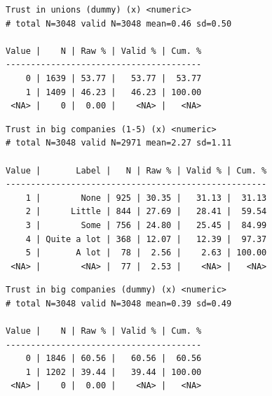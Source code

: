 \documentclass[
  letterpaper,
  DIV=11,
  numbers=noendperiod]{scrreprt}
\newenvironment{Shaded}{\begin{snugshade}}{\end{snugshade}}
\newcommand{\FunctionTok}[1]{\textcolor[rgb]{0.28,0.35,0.67}{#1}}
\newcommand{\NormalTok}[1]{\textcolor[rgb]{0.00,0.23,0.31}{#1}}
\newcommand{\SpecialCharTok}[1]{\textcolor[rgb]{0.37,0.37,0.37}{#1}}
\begin{document}
\begin{Shaded}
\end{Shaded}

\begin{verbatim}
Trust in unions (dummy) (x) <numeric> 
# total N=3048 valid N=3048 mean=0.46 sd=0.50

Value |    N | Raw % | Valid % | Cum. %
---------------------------------------
    0 | 1639 | 53.77 |   53.77 |  53.77
    1 | 1409 | 46.23 |   46.23 | 100.00
 <NA> |    0 |  0.00 |    <NA> |   <NA>
\end{verbatim}

\begin{Shaded}
\end{Shaded}

\begin{verbatim}
Trust in big companies (1-5) (x) <numeric> 
# total N=3048 valid N=2971 mean=2.27 sd=1.11

Value |       Label |   N | Raw % | Valid % | Cum. %
----------------------------------------------------
    1 |        None | 925 | 30.35 |   31.13 |  31.13
    2 |      Little | 844 | 27.69 |   28.41 |  59.54
    3 |        Some | 756 | 24.80 |   25.45 |  84.99
    4 | Quite a lot | 368 | 12.07 |   12.39 |  97.37
    5 |       A lot |  78 |  2.56 |    2.63 | 100.00
 <NA> |        <NA> |  77 |  2.53 |    <NA> |   <NA>
\end{verbatim}

\begin{Shaded}
\end{Shaded}

\begin{verbatim}
Trust in big companies (dummy) (x) <numeric> 
# total N=3048 valid N=3048 mean=0.39 sd=0.49

Value |    N | Raw % | Valid % | Cum. %
---------------------------------------
    0 | 1846 | 60.56 |   60.56 |  60.56
    1 | 1202 | 39.44 |   39.44 | 100.00
 <NA> |    0 |  0.00 |    <NA> |   <NA>
\end{verbatim}
\end{document}

